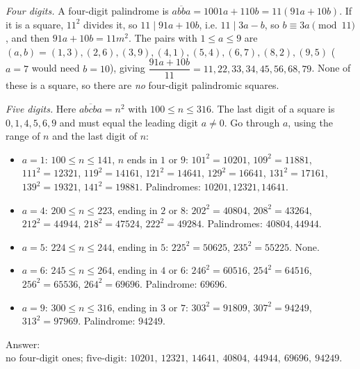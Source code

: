 \emph{Four digits.} A four-digit palindrome is $\overline{abba}=1001a+110b=11(91a+10b)$. If it is a square, $11^2$ divides it, so $11\mid 91a+10b$, i.e. $11\mid 3a-b$, so $b\equiv3a\pmod{11}$, and then $91a+10b=11m^2$. The pairs with $1\le a\le9$ are $(a,b)=(1,3),(2,6),(3,9),(4,1),(5,4),(6,7),(8,2),(9,5)$ ($a=7$ would need $b=10$), giving $\dfrac{91a+10b}{11}=11,22,33,34,45,56,68,79$. None of these is a square, so there are \emph{no} four-digit palindromic squares.

\emph{Five digits.} Here $\overline{abcba}=n^2$ with $100\le n\le316$. The last digit of a square is $0,1,4,5,6,9$ and must equal the leading digit $a\ne0$. Go through $a$, using the range of $n$ and the last digit of $n$:
\begin{itemize}
\item $a=1$: $100\le n\le141$, $n$ ends in $1$ or $9$: $101^2=10201$, $109^2=11881$, $111^2=12321$, $119^2=14161$, $121^2=14641$, $129^2=16641$, $131^2=17161$, $139^2=19321$, $141^2=19881$. Palindromes: $10201,12321,14641$.
\item $a=4$: $200\le n\le223$, ending in $2$ or $8$: $202^2=40804$, $208^2=43264$, $212^2=44944$, $218^2=47524$, $222^2=49284$. Palindromes: $40804,44944$.
\item $a=5$: $224\le n\le244$, ending in $5$: $225^2=50625$, $235^2=55225$. None.
\item $a=6$: $245\le n\le264$, ending in $4$ or $6$: $246^2=60516$, $254^2=64516$, $256^2=65536$, $264^2=69696$. Palindrome: $69696$.
\item $a=9$: $300\le n\le316$, ending in $3$ or $7$: $303^2=91809$, $307^2=94249$, $313^2=97969$. Palindrome: $94249$.
\end{itemize}
Answer: $\boxed{\text{no four-digit ones; five-digit: }10201,\ 12321,\ 14641,\ 40804,\ 44944,\ 69696,\ 94249}$.
